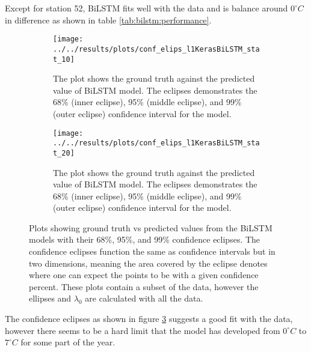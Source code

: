 Except for station 52, BiLSTM fits well with the data and is balance around $0^\circ C$ in difference as shown in table \ref{tab:bilstm:performance}. 

\begin{figure}
	\begin{subfigure}{0.45\linewidth}
		\centering
		\texttt{[image: ../../results/plots/conf\_elips\_l1KerasBiLSTM\_stat\_10]}
		\caption[Confidence eclipse of BiLSTM model 10cm]{The plot shows the ground truth against the predicted value of BiLSTM model. The eclipses demonstrates the 68\% (inner eclipse), 95\% (middle eclipse), and 99\% (outer eclipse) confidence interval for the model.}
		\label{fig:confelipsl1KerasBiLSTMstat10}
	\end{subfigure}
	\hfill
	\begin{subfigure}{0.45\textwidth}
		\centering
		\texttt{[image: ../../results/plots/conf\_elips\_l1KerasBiLSTM\_stat\_20]}
		\caption[Confidence eclipse of BiLSTM model 20cm]{The plot shows the ground truth against the predicted value of BiLSTM model. The eclipses demonstrates the 68\% (inner eclipse), 95\% (middle eclipse), and 99\% (outer eclipse) confidence interval for the model.}
		\label{fig:confelipsl1KerasBiLSTMstat20}
	\end{subfigure}
	\caption{Plots showing ground truth vs predicted values from the BiLSTM models with their 68\%, 95\%, and 99\% confidence eclipses. The confidence eclipses function the same as confidence intervals but in two dimensions, meaning the area covered by the eclipse denotes where one can expect the points to be with a given confidence percent. These plots contain a subset of the data, however the ellipses and $\lambda_0$ are calculated with all the data.}
	\label{fig:bilstm:eclipse}
\end{figure}

The confidence eclipses as shown in figure \ref{fig:bilstm:eclipse} suggests a good fit with the data, however there seems to be a hard limit that the model has developed from $0^\circ C$ to $7^\circ C$ for some part of the year.

